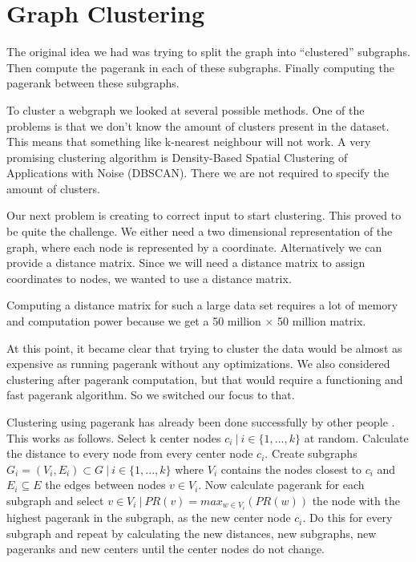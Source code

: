 \documentclass{article}
\begin{document}
\section{Graph Clustering}
The original idea we had was trying to split the graph into ``clustered'' subgraphs. Then compute the pagerank in each of these subgraphs. Finally computing the pagerank between these subgraphs.

To cluster a webgraph we looked at several possible methods. One of the problems is that we don't know the amount of clusters present in the dataset. This means that something like k-nearest neighbour will not work. A very promising clustering algorithm is Density-Based Spatial Clustering of Applications with Noise (DBSCAN). There we are not required to specify the amount of clusters.

Our next problem is creating to correct input to start clustering. This proved to be quite the challenge. We either need a two dimensional representation of the graph, where each node is represented by a coordinate. Alternatively we can provide a distance matrix. Since we will need a distance matrix to assign coordinates to nodes, we wanted to use a distance matrix. 

Computing a distance matrix for such a large data set requires a lot of memory and computation power because we get a 50 million $\times$ 50 million matrix. 

At this point, it became clear that trying to cluster the data would be almost as expensive as running pagerank without any optimizations. We also considered clustering after pagerank computation, but that would require a functioning and fast pagerank algorithm. So we switched our focus to that.

Clustering using pagerank has already been done successfully by other people \cite{hajij2020pagerank}. This works as follows. Select k center nodes $ c_i \:|\: i \in \{1, ..., k\}$ at random. Calculate the distance to every node from every center node $c_i$. Create subgraphs $G_i = (V_i, E_i) \subset G \:|\: i \in \{1, ..., k\}$ where $V_i$ contains the nodes closest to $c_i$ and $E_i \subseteq E$ the edges between nodes $ v \in V_i$. Now calculate pagerank for each subgraph and select $v \in V_i \:|\: PR(v) = max_{w \in V_i}(PR(w))$ the node with the highest pagerank in the subgraph, as the new center node $c_i$. Do this for every subgraph and repeat by calculating the new distances, new subgraphs, new pageranks and new centers until the center nodes do not change.  
\end{document}
